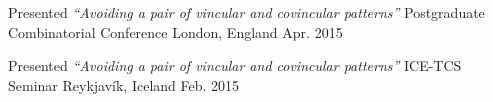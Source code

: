 \begin{cventries}

\cventrypresentation
  {Presented \textit{``Avoiding a pair of vincular and covincular patterns''}} %
  {Postgraduate Combinatorial Conference} %
  {London, England} %
  {Apr. 2015} %


\cventrypresentation
  {Presented \textit{``Avoiding a pair of vincular and covincular patterns''}} %
  {ICE-TCS Seminar} %
  {Reykjavík, Iceland} %
  {Feb. 2015} %



\end{cventries}
